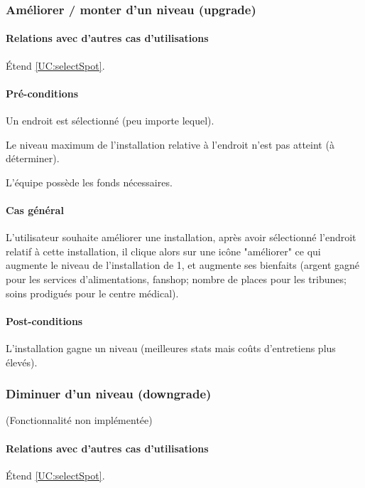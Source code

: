 \subsubsection{Améliorer / monter d'un niveau (upgrade)}
\label{UC:upgrade}
\paragraph{Relations avec d'autres cas d'utilisations}
Étend \ref{UC:selectSpot}.
\paragraph{Pré-conditions}
\begin{list}{}{\leftmargin=1.5em}
\item{Un endroit est sélectionné (peu importe lequel).}
\item{Le niveau maximum de l'installation relative à l'endroit n'est pas atteint (à déterminer).}
\item{L'équipe possède les fonds nécessaires.}
\end{list}
\paragraph{Cas général}
L'utilisateur souhaite améliorer une installation, après avoir sélectionné l'endroit relatif à cette installation, il clique alors sur une icône "améliorer" ce qui augmente le niveau de l'installation de 1, et augmente ses bienfaits (argent gagné pour les services d'alimentations, fanshop; nombre de places pour les tribunes; soins prodigués pour le centre médical).
\paragraph{Post-conditions}
\begin{list}{}{\leftmargin=1.5em}
\item{L'installation gagne un niveau (meilleures stats mais coûts d'entretiens plus élevés).}
\end{list}

\subsubsection{Diminuer d'un niveau (downgrade)}
\label{UC:downgrade}
(Fonctionnalité non implémentée)
\paragraph{Relations avec d'autres cas d'utilisations}
Étend \ref{UC:selectSpot}.
